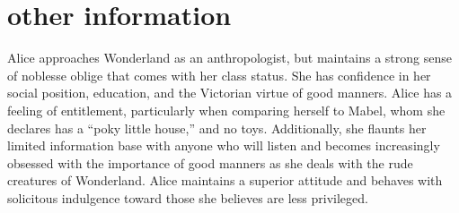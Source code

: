 \documentclass[]{twentysecondcv}
\begin{document}
\section{other information}
Alice approaches Wonderland as an anthropologist, but maintains a strong sense of noblesse oblige that comes with her class status. She has confidence in her social position, education, and the Victorian virtue of good manners. Alice has a feeling of entitlement, particularly when comparing herself to Mabel, whom she declares has a “poky little house,” and no toys. Additionally, she flaunts her limited information base with anyone who will listen and becomes increasingly obsessed with the importance of good manners as she deals with the rude creatures of Wonderland. Alice maintains a superior attitude and behaves with solicitous indulgence toward those she believes are less privileged.

\end{document}
